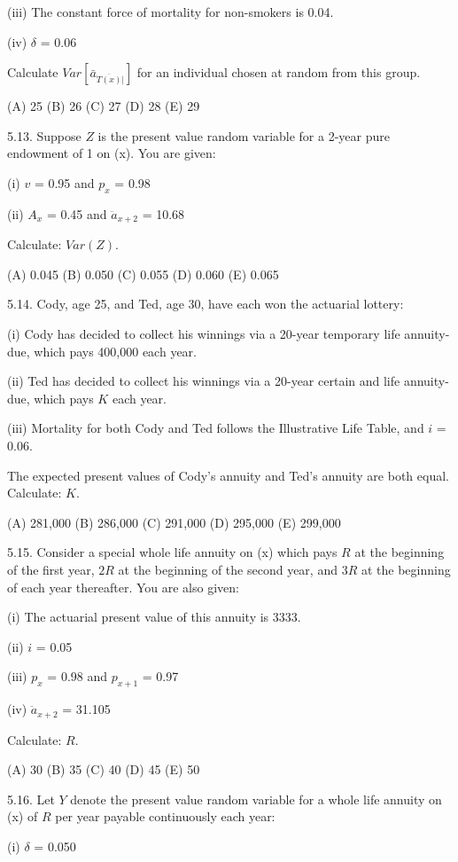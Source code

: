 \documentclass[]{book}
\begin{document}
(iii) The constant force of mortality for non-smokers is 0.04.

(iv) \(\delta\) = 0.06

Calculate \(Var[\bar{a}_{\overline{T(x)}|}]\) for an individual chosen
at random from this group.

(A) 25 (B) 26 (C) 27 (D) 28 (E) 29

5.13. Suppose \(Z\) is the present value random variable for a 2-year
pure endowment of 1 on (x). You are given:

(i) \(v\) = 0.95 and \(p_x\) = 0.98

(ii) \(A_x\) = 0.45 and \(\ddot{a}_{x + 2}\) = 10.68

Calculate: \(Var(Z)\).

(A) 0.045 (B) 0.050 (C) 0.055 (D) 0.060 (E) 0.065

5.14. Cody, age 25, and Ted, age 30, have each won the actuarial
lottery:

(i) Cody has decided to collect his winnings via a 20-year temporary
life annuity-due, which pays 400,000 each year.

(ii) Ted has decided to collect his winnings via a 20-year certain and
life annuity-due, which pays \(K\) each year.

(iii) Mortality for both Cody and Ted follows the Illustrative Life
Table, and \(i\) = 0.06.

The expected present values of Cody's annuity and Ted's annuity are both
equal. Calculate: \(K\).

(A) 281,000 (B) 286,000 (C) 291,000 (D) 295,000 (E) 299,000

5.15. Consider a special whole life annuity on (x) which pays \(R\) at
the beginning of the first year, \(2R\) at the beginning of the second
year, and \(3R\) at the beginning of each year thereafter. You are also
given:

(i) The actuarial present value of this annuity is 3333.

(ii) \(i\) = 0.05

(iii) \(p_x\) = 0.98 and \(p_{x + 1}\) = 0.97

(iv) \(\ddot{a}_{x + 2}\) = 31.105

Calculate: \(R\).

(A) 30 (B) 35 (C) 40 (D) 45 (E) 50

5.16. Let \(Y\) denote the present value random variable for a whole
life annuity on (x) of \(R\) per year payable continuously each year:

(i) \(\delta\) = 0.050
\end{document}
